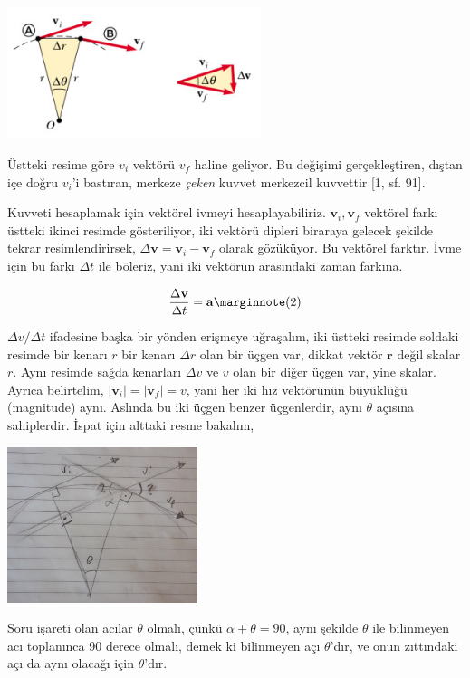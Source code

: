\documentclass[12pt,fleqn]{article}\usepackage{../../common}
\begin{document}
\includegraphics[width=20em]{phy_005_basics_02_02.jpg}

Üstteki resime göre $v_i$ vektörü $v_f$ haline geliyor. Bu değişimi
gerçekleştiren, dıştan içe doğru $v_i$'i bastıran, merkeze {\em çeken} kuvvet
merkezcil kuvvettir [1, sf. 91].

Kuvveti hesaplamak için vektörel ivmeyi hesaplayabiliriz. $\mathbf{v}_i,\mathbf{v}_f$
vektörel farkı üstteki ikinci resimde gösteriliyor, iki vektörü dipleri biraraya gelecek
şekilde tekrar resimlendirirsek, $\Delta \mathbf{v} = \mathbf{v}_i - \mathbf{v}_f$ 
olarak gözüküyor.  Bu vektörel farktır. İvme için bu farkı $\Delta t$ ile
böleriz, yani iki vektörün arasındaki zaman farkına.

$$
\frac{\Delta \mathbf{v}}{\Delta t} = \mathbf{a}
\mlabel{2}
$$

$\Delta v / \Delta t$ ifadesine başka bir yönden erişmeye uğraşalım, iki üstteki
resimde soldaki resimde bir kenarı $r$ bir kenarı $\Delta r$ olan bir üçgen var,
dikkat vektör $\mathbf{r}$ değil skalar $r$. Aynı resimde sağda kenarları
$\Delta v$ ve $v$ olan bir diğer üçgen var, yine skalar. Ayrıca belirtelim,
$|\mathbf{v}_i| = |\mathbf{v}_f| = v$, yani her iki hız vektörünün büyüklüğü
(magnitude) aynı. Aslında bu iki üçgen benzer üçgenlerdir, aynı $\theta$ açısına
sahiplerdir.  İspat için alttaki resme bakalım,

\includegraphics[width=15em]{phy_005_basics_02_01.jpg}

Soru işareti olan acılar $\theta$ olmalı, çünkü $\alpha + \theta = 90$, aynı
şekilde $\theta$ ile bilinmeyen acı toplanınca 90 derece olmalı, demek ki
bilinmeyen açı $\theta$'dır, ve onun zıttındaki açı da aynı olacağı için
$\theta$'dır.
\end{document}
